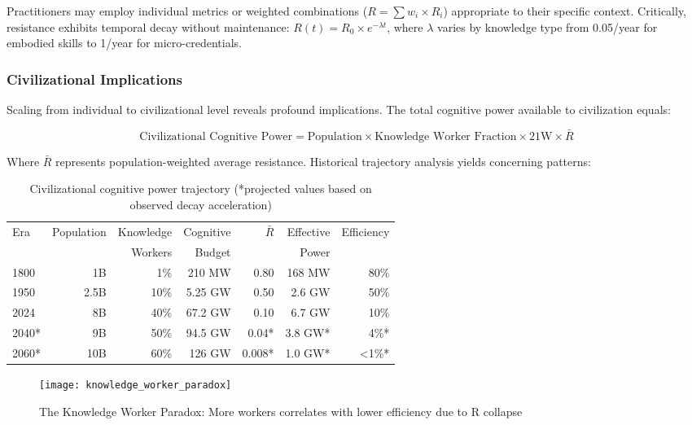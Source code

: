 Practitioners may employ individual metrics or weighted combinations ($R = \sum w_i \times R_i$) appropriate to their specific context. Critically, resistance exhibits temporal decay without maintenance: $R(t) = R_0 \times e^{-\lambda t}$, where $\lambda$ varies by knowledge type from 0.05/year for embodied skills to 1/year for micro-credentials.

\subsubsection{Civilizational Implications}

Scaling from individual to civilizational level reveals profound implications. The total cognitive power available to civilization equals:

\begin{equation}
\text{Civilizational Cognitive Power} = \text{Population} \times \text{Knowledge Worker Fraction} \times 21\text{W} \times \bar{R}
\end{equation}

Where $\bar{R}$ represents population-weighted average resistance. Historical trajectory analysis yields concerning patterns:

\begin{table}[h]
\centering
\caption{Civilizational cognitive power trajectory (*projected values based on observed decay acceleration)}
\begin{tabular}{|l|r|r|r|r|r|r|}
\hline
Era & Population & Knowledge & Cognitive & $\bar{R}$ & Effective & Efficiency \\
    &            & Workers   & Budget    &           & Power     &            \\
\hline
1800 & 1B & 1\% & 210 MW & 0.80 & 168 MW & 80\% \\
1950 & 2.5B & 10\% & 5.25 GW & 0.50 & 2.6 GW & 50\% \\
2024 & 8B & 40\% & 67.2 GW & 0.10 & 6.7 GW & 10\% \\
2040* & 9B & 50\% & 94.5 GW & 0.04* & 3.8 GW* & 4\%* \\
2060* & 10B & 60\% & 126 GW & 0.008* & 1.0 GW* & <1\%* \\
\hline
\end{tabular}
\end{table}

\begin{figure}[h]
\centering
\texttt{[image: knowledge\_worker\_paradox]}
\caption{The Knowledge Worker Paradox: More workers correlates with lower efficiency due to R collapse}
\label{fig:knowledge_worker_paradox}
\end{figure}

